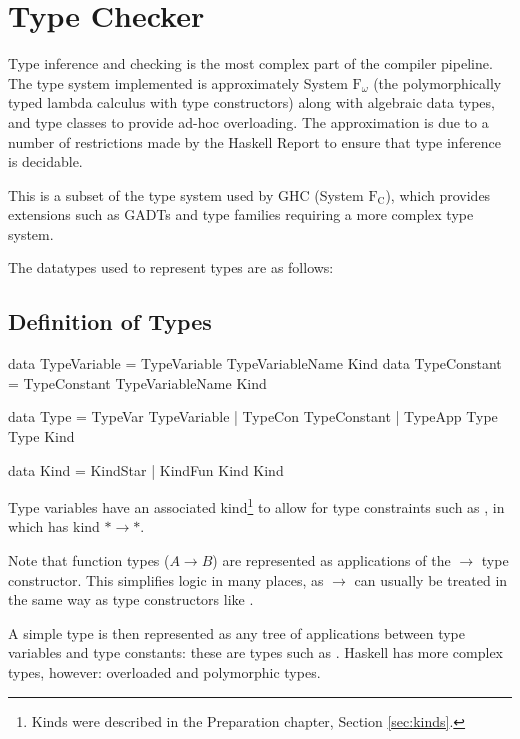 \documentclass[dissertation.tex]{subfiles}
\begin{document}
\section{Type Checker}
{
    Type inference and checking is the most complex part of the compiler pipeline. The type system implemented is approximately System \(\text{F}_\omega\) (the polymorphically typed lambda calculus with type constructors) along with algebraic data types, and type classes to provide ad-hoc overloading. The approximation is due to a number of restrictions made by the Haskell Report to ensure that type inference is decidable.
    
    This is a subset of the type system used by GHC (System \(\text{F}_\text{C}\)), which provides extensions such as GADTs and type families requiring a more complex type system.

    The datatypes used to represent types are as follows:

    \subsection{Definition of Types}
    {
        \begin{haskellfigure}
        data TypeVariable = TypeVariable TypeVariableName Kind
        data TypeConstant = TypeConstant TypeVariableName Kind

        data Type = TypeVar TypeVariable
                  | TypeCon TypeConstant
                  | TypeApp Type Type Kind

        data Kind = KindStar
                  | KindFun Kind Kind
        \end{haskellfigure}

        Type variables have an associated kind\footnote{Kinds were described in the Preparation chapter, Section \ref{sec:kinds}.} to allow for type constraints such as , in which  has kind \(*\rightarrow*\).

        Note that function types (\(A \rightarrow B\)) are represented as applications of the \(\rightarrow\) type constructor. This simplifies logic in many places, as \(\rightarrow\) can usually be treated in the same way as type constructors like .

        A simple type is then represented as any tree of applications between type variables and type constants: these are types such as . Haskell has more complex types, however: overloaded and polymorphic types.

}}
\end{document}

